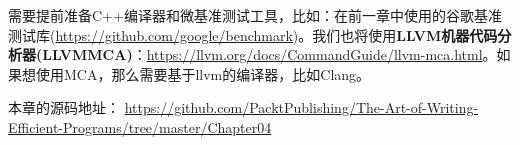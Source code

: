 需要提前准备C++编译器和微基准测试工具，比如：在前一章中使用的谷歌基准测试库(\url{https://github.com/google/benchmark})。我们也将使用\textbf{LLVM机器代码分析器(LLVMMCA)}：\url{https://llvm.org/docs/CommandGuide/llvm-mca.html}。如果想使用MCA，那么需要基于llvm的编译器，比如Clang。

本章的源码地址： \url{https://github.com/PacktPublishing/The-Art-of-Writing-Efficient-Programs/tree/master/Chapter04}